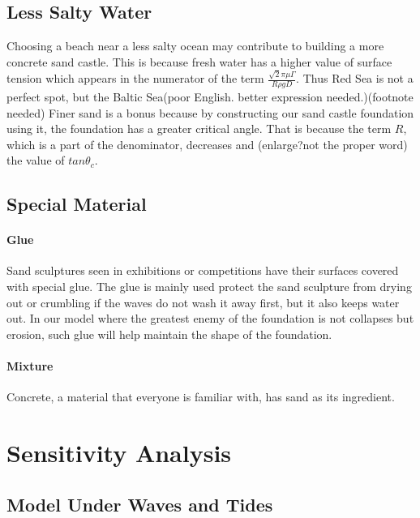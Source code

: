 \documentclass[12pt]{article}
\begin{document}
\subsection{Less Salty Water}
Choosing a beach near a less salty ocean may contribute to building a more concrete sand castle. This is because fresh water has a higher value of surface tension which appears in the numerator of the term $\frac{\sqrt{2}\pi\mu\Gamma}{R\rho gD}$. Thus Red Sea is not a perfect spot, but the Baltic Sea(poor English. better expression needed.)(footnote needed)
Finer sand is a bonus because by constructing our sand castle foundation using it, the foundation has a greater critical angle. That is because the term $R$, which is a part of the denominator, decreases and (enlarge?not the proper word) the value of $tan\theta_c$.
\subsection{Special Material}
\paragraph{Glue}
Sand sculptures seen in exhibitions or competitions have their surfaces covered with special glue. The glue is mainly used protect the sand sculpture from drying out or crumbling if the waves do not wash it away first, but it also keeps water out. In our model where the greatest enemy of the foundation is not collapses but erosion, such glue will help maintain the shape of the foundation.
\paragraph{Mixture}
Concrete, a material that everyone is familiar with, has sand as its ingredient.

\section{Sensitivity Analysis}
\subsection{Model Under Waves and Tides}
\end{document}
